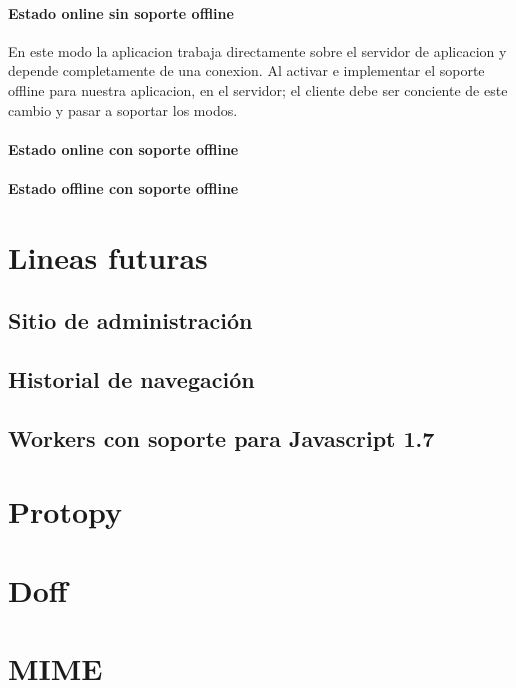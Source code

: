 \documentclass[a4paper]{report}
\begin{document}
\subsubsection{Estado online sin soporte offline}
En este modo la aplicacion trabaja directamente sobre el servidor de aplicacion y depende completamente de una conexion.
Al activar e implementar el soporte offline para nuestra aplicacion, en el servidor; el cliente debe ser conciente de este cambio y pasar a soportar los modos.
\subsubsection{Estado online con soporte offline}
\subsubsection{Estado offline con soporte offline}

\chapter{Lineas futuras}
\section{Sitio de administración}
\section{Historial de navegación}
\section{Workers con soporte para Javascript 1.7}

\appendix
\chapter{Protopy}

\chapter{Doff}

\chapter{MIME}
\end{document}
